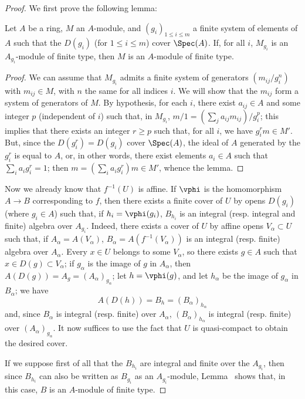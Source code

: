 \begin{proof}
We first prove the following lemma:

  \begin{lemma}[6.1.4.1]
  \label{II.6.1.4.1}
  Let $A$ be a ring, $M$ an $A$-module, and $(g_i)_{1\leq i\leq m}$ a finite system of elements of $A$ such that the $D(g_i)$ (for $1\leq i\leq m$) cover $\Spec(A)$.
  If, for all $i$, $M_{g_i}$ is an $A_{g_i}$-module of finite type, then $M$ is an $A$-module of finite type.
  \end{lemma}

  \begin{proof}
  We can assume that $M_{g_i}$ admits a finite system of generators $(m_{ij}/g_i^n)$ with $m_{ij}\in M$, with $n$ the same for all indices $i$.
  We will show that the $m_{ij}$ form a system of generators of $M$.
  By hypothesis, for each $i$, there exist $a_{ij}\in A$ and some integer $p$ (independent of $i$) such that, in $M_{g_i}$, $m/1=(\sum_j a_{ij}m_{ij})/g_i^p$;
  this implies that there exists an integer $r\geq p$ such that, for all $i$, we have $g_i^rm\in M'$.
  But, since the $D(g_i^r)=D(g_i)$ cover $\Spec(A)$, the ideal of $A$ generated by the $g_i^r$ is equal to $A$, or, in other words, there exist elements $a_i\in A$ such that $\sum_i a_ig_i^r=1$;
  then $m=(\sum_i a_i g_i^r)m\in M'$, whence the lemma.
  \end{proof}

Now we already know  that $f^{-1}(U)$ is affine.
If $\vphi$ is the homomorphism $A\to B$ corresponding to $f$, then there exists a finite cover of $U$ by opens $D(g_i)$ (where $g_i\in A$) such that, if $h_i=\vphi(g_i)$, $B_{h_i}$ is an integral (resp. integral and finite) algebra over $A_{g_i}$.
Indeed, there exists a cover of $U$ by affine opens $V_\alpha\subset U$ such that, if $A_\alpha=A(V_\alpha)$, $B_\alpha=A(f^{-1}(V_\alpha))$ is an integral (resp. finite) algebra over $A_\alpha$.
Every $x\in U$ belongs to some $V_\alpha$, so there exists $g\in A$ such that $x\in D(g)\subset V_\alpha$;
if $g_\alpha$ is the image of $g$ in $A_\alpha$, then $A(D(g))=A_g=(A_\alpha)_{g_\alpha}$;
let $h=\vphi(g)$, and let $h_\alpha$ be the image of $g_\alpha$ in $B_\alpha$;
we have
\[
  A(D(h)) = B_h = (B_\alpha)_{h_\alpha}
\]
and, since $B_\alpha$ is integral (resp. finite) over $A_\alpha$, $(B_\alpha)_{h_\alpha}$ is integral (resp. finite) over $(A_\alpha)_{g_\alpha}$.
It now suffices to use the fact that $U$ is quasi-compact to obtain the desired cover.

If we suppose first of all that the $B_{h_i}$ are integral and finite over the $A_{g_i}$, then since $B_{h_i}$ can also be written as $B_{g_i}$ as an $A_{g_i}$-module, Lemma~ shows that, in this case, $B$ is an $A$-module of finite type.


\end{proof}
